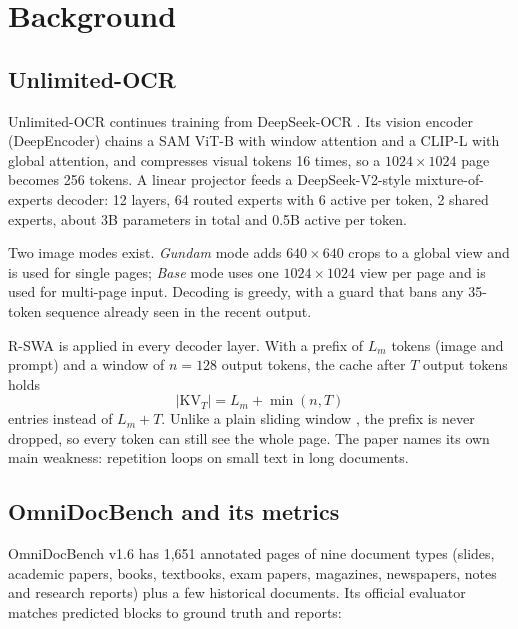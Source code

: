 \documentclass[journal]{IEEEtran}
\begin{document}
\section{Background}

\subsection{Unlimited-OCR}

Unlimited-OCR continues training from DeepSeek-OCR \cite{wei2025deepseekocr}.
Its vision encoder (DeepEncoder) chains a SAM ViT-B \cite{kirillov2023sam} with
window attention and a CLIP-L \cite{radford2021clip} with global attention, and
compresses visual tokens 16 times, so a $1024\times1024$ page becomes 256 tokens.
A linear projector feeds a DeepSeek-V2-style \cite{deepseek2024v2}
mixture-of-experts decoder: 12 layers, 64 routed experts with 6 active per token,
2 shared experts, about 3B parameters in total and 0.5B active per token.

Two image modes exist. \emph{Gundam} mode adds $640\times640$ crops to a global
view and is used for single pages; \emph{Base} mode uses one $1024\times1024$
view per page and is used for multi-page input. Decoding is greedy, with a
guard that bans any 35-token sequence already seen in the recent output.

R-SWA is applied in every decoder layer. With a prefix of $L_m$ tokens (image and
prompt) and a window of $n=128$ output tokens, the cache after $T$ output tokens
holds
\begin{equation}
|\mathrm{KV}_T| = L_m + \min(n, T)
\end{equation}
entries instead of $L_m + T$. Unlike a plain sliding window
\cite{beltagy2020longformer}, the prefix is never dropped, so every token can
still see the whole page. The paper names its own main weakness: repetition
loops on small text in long documents.

\subsection{OmniDocBench and its metrics}

OmniDocBench v1.6 \cite{ouyang2025omnidocbench} has 1,651 annotated pages of
nine document types (slides, academic papers, books, textbooks, exam papers,
magazines, newspapers, notes and research reports) plus a few historical
documents. Its official evaluator matches predicted blocks to ground truth and
reports:
\end{document}
